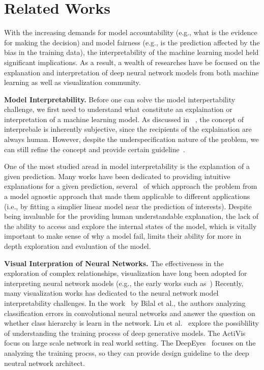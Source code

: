 
\section{Related Works}
With the increasing demands for model accountability (e.g., what is the evidence for making the decision) and model fairness (e.g., is the prediction affected by the bias in the training data),
the interpretability of the machine learning model held significant implications. As a result, a wealth of researches have be focused on the explanation and interpretation of deep neural network models from both machine learning as well as visualization community.

\noindent\textbf{Model Interpretability.}
Before one can solve the model interpertability challenge, we first need to understand what constitute an explaination or interpretation of a machine learning model.
As discussed in ~\cite{Lipton2016, Doshi-Velez2017}, the concept of interprebale is inherently subjective, since the recipients of the explaination are always human.
However, despite the underspecification nature of the problem, we can still refine the concept and provide certain guideline~\cite{Doshi-Velez2017}.

One of the most studied aread in model interpretability is the explanation of a given prediction.
Many works have been dedicated to providing intuitive explanations for a given prediction, several~\cite{RibeiroSinghGuestrin2016, KrausePererNg2016} of which approach the problem from a model agnostic approach that made them applicable to different applications (i.e., by fitting a simplier linear model near the prediction of interests).
%
Despite being invaluable for the providing human understandable explanation, the lack of the ability to access and explore the internal states of the model, which is vitally important to make sense of why a model fail, limits their ability for more in depth exploration and evaluation of the model.

\noindent\textbf{Visual Interpration of Neural Networks.}
The effectiveness in the exploration of complex relationships, visualization have long been adopted for interpreting neural network models (e.g., the early works such as~\cite{TzengMa2005})
Recently, many visualization works has dedicated to the neural network model interpretability challenges.
In the work~\cite{BilalJourablooYe2018} by Bilal et al., the authors analyzing classification errors in convolutional neural networks and answer the question on whether class hierarchy is learn in the network.
Liu et al.~\cite{LiuShiCao2018} explore the possiblility of understanding the training process of deep generative models.
The ActiVis~\cite{KahngAndrewsKalro2018} focus on large scale network in real world setting.
The DeepEyes~\cite{Pezzotti2018} focuses on the analyzing the training procss, so they can provide design guideline to the deep neutral network architect.

